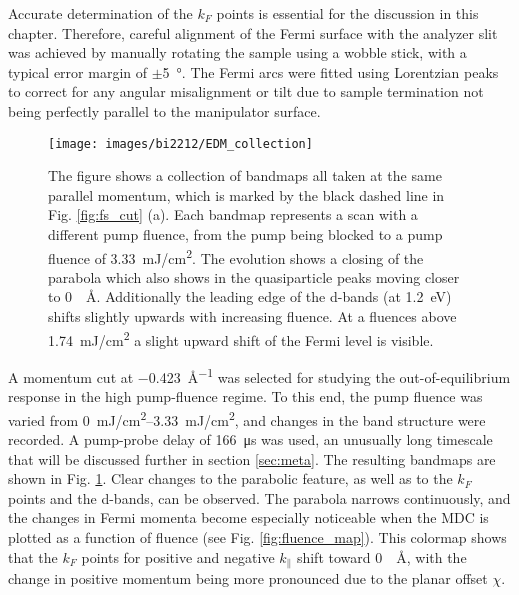 Accurate determination of the $k_F$ points is essential for the discussion in this chapter.
Therefore, careful alignment of the Fermi surface with the analyzer slit was achieved by manually rotating the sample using a wobble stick, with a typical error margin of $\pm$\qty{5}{\degree}.
The Fermi arcs were fitted using Lorentzian peaks to correct for any angular misalignment or tilt due to sample termination not being perfectly parallel to the manipulator surface.

\begin{figure}[th!]
	\centering
	\texttt{[image: images/bi2212/EDM\_collection]}
	\caption{The figure shows a collection of bandmaps all taken at the same parallel momentum, which is marked by the black dashed line in Fig. \ref{fig:fs_cut} (a). Each bandmap represents a scan with a different pump fluence, from the pump being blocked to a pump fluence of \qty{3.33}{\milli\joule/\centi\meter\squared}. The evolution shows a closing of the parabola which also shows in the quasiparticle peaks moving closer to \qty{0}{\per\angstrom}. Additionally the leading edge of the  d-bands (at \qty{1.2}{\electronvolt}) shifts slightly upwards with increasing fluence. At a fluences above \qty{1.74}{\milli\joule/\centi\meter\squared} a slight upward shift of the Fermi level is visible.}
	\label{fig:edm_collection}
\end{figure}

A momentum cut at \qty{-0.423}{\angstrom^{-1}} was selected for studying the out-of-equilibrium response in the high pump-fluence regime.
To this end, the pump fluence was varied from \qtyrange{0}{3.33}{\milli\joule/\centi\meter\squared}, and changes in the band structure were recorded.
A pump-probe delay of \qty{166}{\micro\second} was used, an unusually long timescale that will be discussed further in section \ref{sec:meta}.
The resulting bandmaps are shown in Fig. \ref{fig:edm_collection}.
Clear changes to the parabolic feature, as well as to the $k_F$ points and the  d-bands, can be observed.
The parabola narrows continuously, and the changes in Fermi momenta become especially noticeable when the MDC is plotted as a function of fluence (see Fig. \ref{fig:fluence_map}).
This colormap shows that the $k_F$ points for positive and negative $k_\parallel$ shift toward \qty{0}{\per\angstrom}, with the change in positive momentum being more pronounced due to the planar offset $\chi$.

